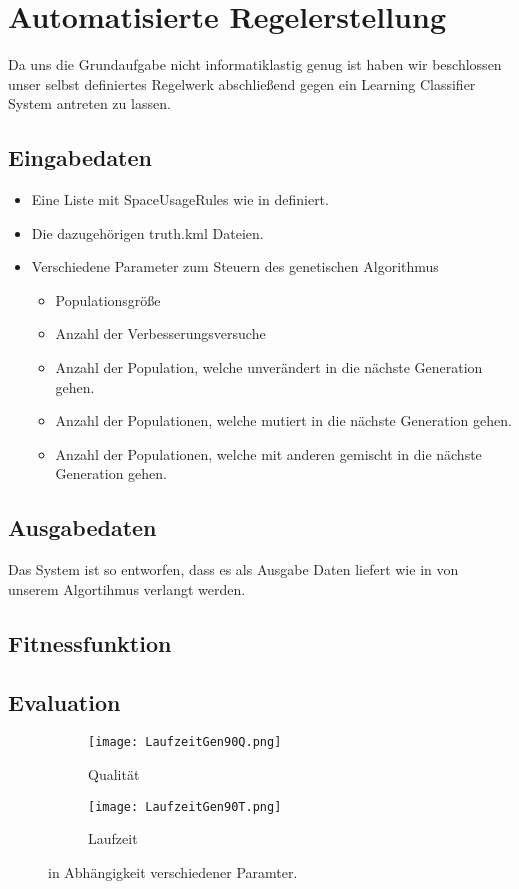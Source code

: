 \section{Automatisierte Regelerstellung}
Da uns die Grundaufgabe nicht informatiklastig genug ist
haben wir beschlossen unser selbst definiertes Regelwerk abschließend gegen ein Learning Classifier System antreten zu lassen.


\subsection{Eingabedaten}
\begin{itemize}
\item Eine Liste mit SpaceUsageRules wie in  definiert.
\item Die dazugehörigen truth.kml Dateien.
\item Verschiedene Parameter zum Steuern des genetischen Algorithmus
  \begin{itemize}
  \item Populationsgröße
  \item Anzahl der Verbesserungsversuche
  \item Anzahl der Population, welche unverändert in die nächste Generation gehen.
  \item Anzahl der Populationen, welche mutiert in die nächste Generation gehen.
  \item Anzahl der Populationen, welche mit anderen gemischt in die nächste Generation gehen.
  \end{itemize}
\end{itemize}

\subsection{Ausgabedaten}
Das System ist so entworfen, dass es als Ausgabe Daten liefert wie in  von unserem Algortihmus verlangt werden.

\subsection{Fitnessfunktion}

\subsection{Evaluation}
\label{sec:Evaluation_genAlg}
\begin{figure}
  \begin{subfigure}[b]{\textwidth}
  \texttt{[image: LaufzeitGen90Q.png]}
  \caption{Qualität}
  \end{subfigure}

  \begin{subfigure}[b]{\textwidth}
  \texttt{[image: LaufzeitGen90T.png]}
  \caption{Laufzeit}
  \end{subfigure}
\caption{in Abhängigkeit verschiedener Paramter.\protect\footnotemark}
\label{fig:GenAlgAll}
\end{figure}

